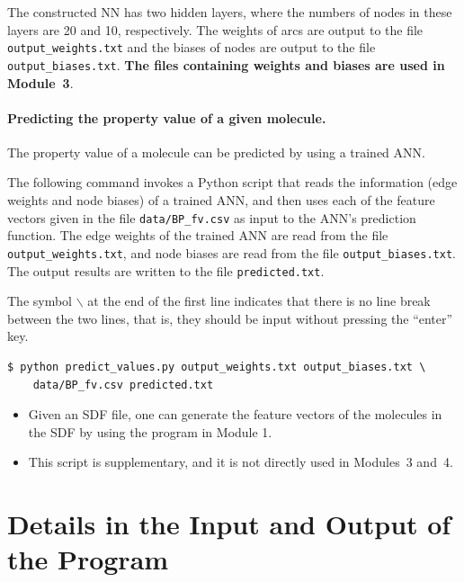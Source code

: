 \documentclass[11pt, titlepage, dvipdfmx, twoside]{article}
\begin{document}
The constructed NN has two hidden layers,
where the numbers of nodes in these layers
are 20 and 10, respectively.
The weights of arcs are output to the file \verb|output_weights.txt|
and the biases of nodes are output to the file
\verb|output_biases.txt|.  
%
{\bf The files containing weights and biases are used in Module~3}. 


\paragraph{Predicting the property value of a given molecule.}
The property value of a molecule can be predicted by using a trained ANN.

The following command invokes a Python  script that
reads the information (edge weights and node biases)
of a trained ANN, and then uses each of the feature vectors
given in the file \verb|data/BP_fv.csv| as input to the
ANN's prediction function.
The edge weights of the trained ANN are read from the file \verb|output_weights.txt|,
and node biases are read from the file \verb|output_biases.txt|.
The output results 
are written to the file \verb|predicted.txt|. 

\begin{oframed}
  {\small
\noindent The symbol $\backslash$ at the end of the first line indicates that there
is no line break between the two lines, that is, they should be input without 
pressing the ``enter'' key.
\begin{verbatim}
$ python predict_values.py output_weights.txt output_biases.txt \
    data/BP_fv.csv predicted.txt
\end{verbatim}
}
  \end{oframed}

\begin{itemize}
\item Given an SDF file,
  one can generate the feature vectors of the molecules in the SDF
  by using the program in Module 1.
\item This script is supplementary, and it is not directly used in Modules~3 and~4. 
\end{itemize}


\section{Details in the Input and Output of the Program}
\label{sec:io}
\end{document}
